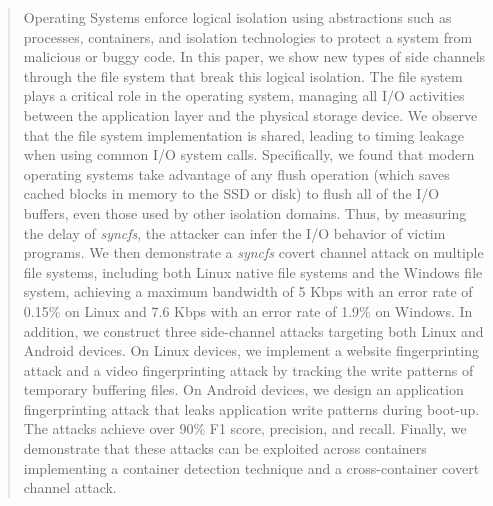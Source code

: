 \begin{abstract}
Operating Systems enforce logical isolation using abstractions such as processes, containers, and isolation technologies to protect a system from malicious or buggy code.  In this paper, we show new types of side channels through the file system that break this logical isolation.  The file system plays a critical role in the operating system, managing all I/O activities between the application layer and the physical storage device. 
We observe that the file system implementation is shared, leading to timing leakage when using common I/O system calls. Specifically, we found that modern operating systems take advantage of any flush operation (which saves cached blocks in memory to the SSD or disk) to flush all of the I/O buffers, even those used by other isolation domains.   Thus, by measuring the delay of \textit{syncfs}, the attacker can infer the I/O behavior of victim programs.  We then demonstrate a \textit{syncfs} covert channel attack on multiple file systems, including both Linux native file systems and the Windows file system, achieving a maximum bandwidth of 5 Kbps with an error rate of 0.15\% on Linux and 7.6 Kbps with an error rate of 1.9\% on Windows. 
In addition, we construct three side-channel attacks targeting both Linux and Android devices. On Linux devices, we implement a website fingerprinting attack and a video fingerprinting attack by tracking the write patterns of temporary buffering files. On Android devices, we design an application fingerprinting attack that leaks application write patterns during boot-up.  The attacks achieve over 90\% F1 score, precision, and recall. Finally, we demonstrate that these attacks can be exploited across containers implementing a container detection technique and a cross-container covert channel attack.



\end{abstract}
